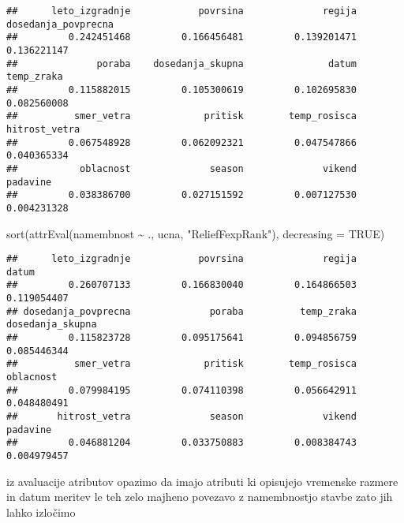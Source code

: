 \documentclass[
]{article}
\newenvironment{Shaded}{\begin{snugshade}}{\end{snugshade}}
\newcommand{\AttributeTok}[1]{\textcolor[rgb]{0.77,0.63,0.00}{#1}}
\newcommand{\ConstantTok}[1]{\textcolor[rgb]{0.00,0.00,0.00}{#1}}
\newcommand{\FunctionTok}[1]{\textcolor[rgb]{0.00,0.00,0.00}{#1}}
\newcommand{\NormalTok}[1]{#1}
\newcommand{\SpecialCharTok}[1]{\textcolor[rgb]{0.00,0.00,0.00}{#1}}
\newcommand{\StringTok}[1]{\textcolor[rgb]{0.31,0.60,0.02}{#1}}
\begin{document}
\begin{verbatim}
##      leto_izgradnje            povrsina              regija dosedanja_povprecna 
##         0.242451468         0.166456481         0.139201471         0.136221147 
##              poraba    dosedanja_skupna               datum          temp_zraka 
##         0.115882015         0.105300619         0.102695830         0.082560008 
##          smer_vetra             pritisk        temp_rosisca       hitrost_vetra 
##         0.067548928         0.062092321         0.047547866         0.040365334 
##           oblacnost              season              vikend            padavine 
##         0.038386700         0.027151592         0.007127530         0.004231328
\end{verbatim}

\begin{Shaded}
\begin{Highlighting}[]
\FunctionTok{sort}\NormalTok{(}\FunctionTok{attrEval}\NormalTok{(namembnost }\SpecialCharTok{\textasciitilde{}}\NormalTok{ ., ucna, }\StringTok{"ReliefFexpRank"}\NormalTok{), }\AttributeTok{decreasing =} \ConstantTok{TRUE}\NormalTok{)}
\end{Highlighting}
\end{Shaded}

\begin{verbatim}
##      leto_izgradnje            povrsina              regija               datum 
##         0.260707133         0.166830040         0.164866503         0.119054407 
## dosedanja_povprecna              poraba          temp_zraka    dosedanja_skupna 
##         0.115823728         0.095175641         0.094856759         0.085446344 
##          smer_vetra             pritisk        temp_rosisca           oblacnost 
##         0.079984195         0.074110398         0.056642911         0.048480491 
##       hitrost_vetra              season              vikend            padavine 
##         0.046881204         0.033750883         0.008384743         0.004979457
\end{verbatim}

iz avaluacije atributov opazimo da imajo atributi ki opisujejo vremenske
razmere in datum meritev le teh zelo majheno povezavo z namembnostjo
stavbe zato jih lahko izločimo
\end{document}
